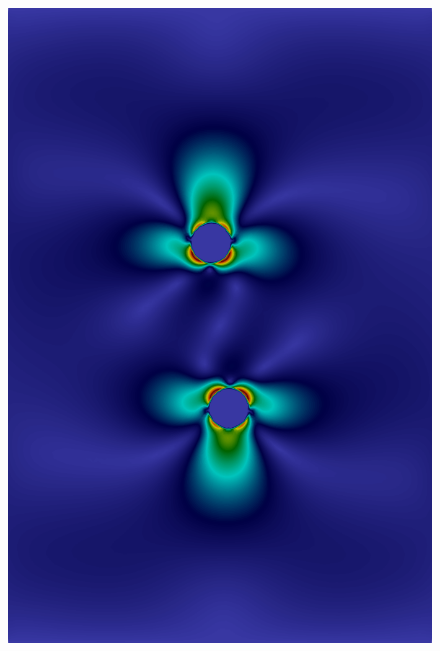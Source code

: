 \documentclass[graybox]{svmult}
\begin{document}
\begin{figure}
	\includegraphics[scale=0.14]{img-squirmer-t=0.1.png}

\end{figure}
\end{document}
